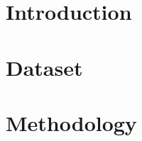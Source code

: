\documentclass[10pt,sigconf]{acmart}
\begin{document}


\maketitle

\section{Introduction}



\section{Dataset}



\section{Methodology}

\end{document}
